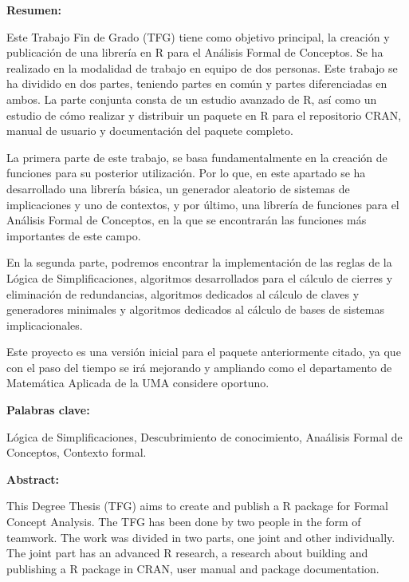 \setcounter{page}{5}
{

\textbf{Resumen:}

Este Trabajo Fin de Grado (TFG) tiene como objetivo principal, la creaci\'on y publicaci\'on de una librer\'ia 
en R para el An\'alisis Formal de Conceptos. Se ha realizado en la modalidad de trabajo en equipo de dos personas. 
Este trabajo se ha dividido en dos partes, teniendo partes en com\'un y partes diferenciadas en ambos. La parte conjunta 
consta de un estudio avanzado de R, as\'i como un estudio de c\'omo realizar y distribuir un paquete en R para el repositorio 
CRAN, manual de usuario y documentaci\'on del paquete completo.

La primera parte de este trabajo, se basa fundamentalmente en la creaci\'on de funciones para su posterior utilizaci\'on. Por lo que, 
en este apartado se ha desarrollado una librer\'ia b\'asica, un generador aleatorio de sistemas de implicaciones y uno de contextos, y 
por \'ultimo, una librer\'ia de funciones para el An\'alisis Formal de Conceptos, en la que se encontrar\'an las funciones m\'as importantes 
de este campo.

En la segunda parte, podremos encontrar la implementaci\'on de las reglas de la L\'ogica de Simplificaciones, algoritmos desarrollados para 
el c\'alculo de cierres y eliminaci\'on de redundancias, algoritmos dedicados al c\'alculo de claves y generadores minimales y
algoritmos dedicados al c\'alculo de bases de sistemas implicacionales.

Este proyecto es una versi\'on inicial para el paquete anteriormente citado, ya que con el paso del tiempo se ir\'a mejorando y ampliando como 
el departamento de Matem\'atica Aplicada de la UMA considere oportuno.



\bigskip

\textbf{Palabras clave:}

L\'ogica de Simplificaciones, Descubrimiento de conocimiento, 
Ana\'alisis Formal de Conceptos, Contexto formal.

\clearpage

\textbf{Abstract:}

This Degree Thesis (TFG) aims to create and publish a R package for Formal Concept Analysis. The TFG has been done by two people in the 
form of teamwork. The work was divided in two parts, one joint and other individually. The joint part has an advanced R research, 
a research about building and publishing a R package in CRAN, user manual and package documentation. 

}
